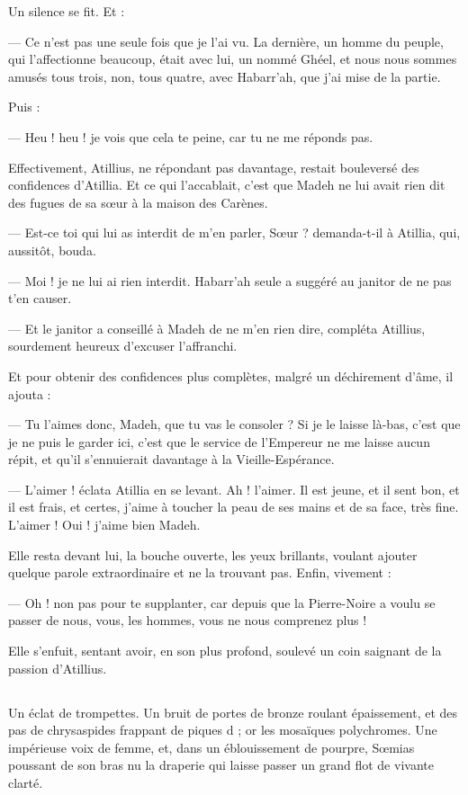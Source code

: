 \documentclass[a4paper, 11pt, oneside, polutonikogreek, french]{article}
\begin{document}
Un silence se fit. Et :

--- Ce n'est pas une seule fois que je l'ai vu. La dernière, un homme du peuple, qui l'affectionne beaucoup, était avec lui, un nommé Ghéel, et nous nous sommes amusés tous trois, non, tous quatre, avec Habarr'ah, que j'ai mise de la partie.

Puis :

--- Heu ! heu ! je vois que cela te peine, car tu ne me réponds pas.

Effectivement, Atillius, ne répondant pas davantage, restait bouleversé des confidences d'Atillia. Et ce qui l'accablait, c'est que Madeh ne lui avait rien dit des fugues de sa sœur à la maison des Carènes.

--- Est-ce toi qui lui as interdit de m'en parler, Sœur ? demanda-t-il à Atillia, qui, aussitôt, bouda.

--- Moi ! je ne lui ai rien interdit. Habarr'ah seule a suggéré au janitor de ne pas t'en causer.

--- Et le janitor a conseillé à Madeh de ne m'en rien dire, compléta Atillius, sourdement heureux d'excuser l'affranchi.

Et pour obtenir des confidences plus complètes, malgré un déchirement d'âme, il ajouta :

--- Tu l'aimes donc, Madeh, que tu vas le consoler ? Si je le laisse là-bas, c'est que je ne puis le garder ici, c'est que le service de l'Empereur ne me laisse aucun répit, et qu'il s'ennuierait davantage à la Vieille-Espérance.

--- L'aimer ! éclata Atillia en se levant. Ah ! l'aimer. Il est jeune, et il sent bon, et il est frais, et certes, j'aime à toucher la peau de ses mains et de sa face, très fine. L'aimer ! Oui ! j'aime bien Madeh.

Elle resta devant lui, la bouche ouverte, les yeux brillants, voulant ajouter quelque parole extraordinaire et ne la trouvant pas. Enfin, vivement :

--- Oh ! non pas pour te supplanter, car depuis que la Pierre-Noire a voulu se passer de nous, vous, les hommes, vous ne nous comprenez plus !

Elle s'enfuit, sentant avoir, en son plus profond, soulevé un coin saignant de la passion d'Atillius.
\clearpage
\subsection{}
\paragraph{}
Un éclat de trompettes. Un bruit de portes de bronze roulant épaissement, et des pas de chrysaspides frappant de piques d ; or les mosaïques polychromes. Une impérieuse voix de femme, et, dans un éblouissement de pourpre, Sœmias poussant de son bras nu la draperie qui laisse passer un grand flot de vivante clarté.
\end{document}
